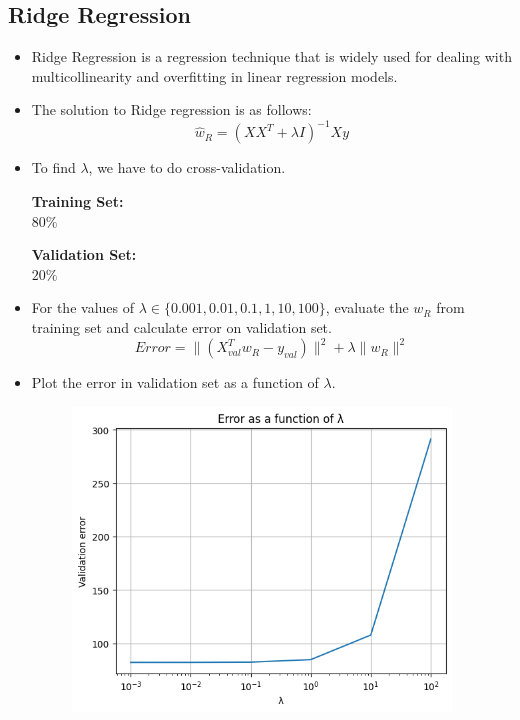 \documentclass[12pt, a4paper]{article}
\begin{document}
\subsection{Ridge Regression}
\begin{itemize}
    \item \large Ridge Regression is a regression technique that is widely used for dealing with multicollinearity and overfitting in linear regression models. 
    \item \large The solution to Ridge regression is as follows:
    \large \[\hat{w}_R  = (XX^T+\lambda I)^{-1}Xy\]
    \item \large To find $\lambda$, we have to do cross-validation.
    \begin{tcolorbox}[colback=white,colframe=black]
        \begin{minipage}[t]{0.45\textwidth}
            \centering \textbf{Training Set:} \\
            $80\%$
        \end{minipage}\hfill
        \begin{minipage}[t]{0.45\textwidth}
            \centering \textbf{Validation Set:} \\
            $20\%$
        \end{minipage}
    \end{tcolorbox}
    \item \large For the values of $\lambda\in \{0.001,0.01,0.1,1,10,100\}$, evaluate the $w_R$ from training set and calculate error on validation set.
    \[Error=\|(X_{val}^Tw_R-y_{val})\|^2+\lambda\|w_R\|^2\]
    \item \large Plot the error in validation set as a function of $\lambda$.
    \begin{figure}[ht]
        \centering
        \includegraphics[width=0.95\textwidth]{Ridge_regression}

\end{figure}
\end{itemize}
\end{document}
